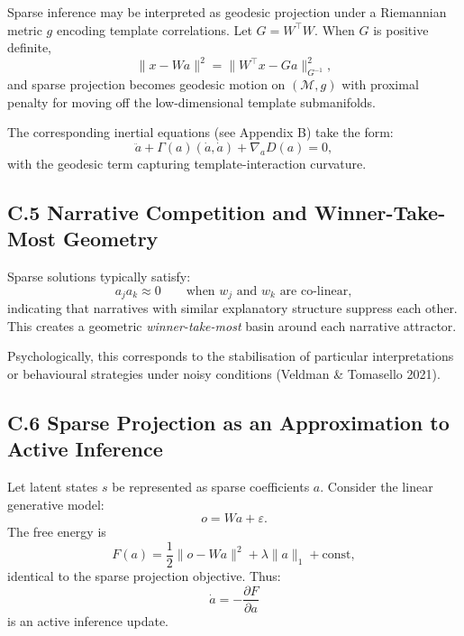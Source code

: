 \documentclass[11pt,a4paper,twoside]{article}
\begin{document}
Sparse inference may be interpreted as geodesic projection under a Riemannian metric $g$ encoding template correlations. Let $G = W^\top W$. When $G$ is positive definite,
\[
\|x - Wa\|^2 = \|W^\top x - Ga\|_{G^{-1}}^2,
\]
and sparse projection becomes geodesic motion on $(\mathcal{M}, g)$ with proximal penalty for moving off the low-dimensional template submanifolds.

The corresponding inertial equations (see Appendix B) take the form:
\[
\ddot{a} + \Gamma(a)(\dot{a},\dot{a}) +
\nabla_a D(a) = 0,
\]
with the geodesic term capturing template-interaction curvature.

\subsection*{C.5 Narrative Competition and Winner-Take-Most Geometry}

Sparse solutions typically satisfy:
\[
a_j a_k \approx 0 \qquad \text{when } w_j \text{ and } w_k \text{ are co-linear},
\]
indicating that narratives with similar explanatory structure suppress each other. This creates a geometric \emph{winner-take-most} basin around each narrative attractor.

\begin{center}
\end{center}

Psychologically, this corresponds to the stabilisation of particular interpretations or behavioural strategies under noisy conditions (Veldman \& Tomasello 2021).

\subsection*{C.6 Sparse Projection as an Approximation to Active Inference}

Let latent states $s$ be represented as sparse coefficients $a$. Consider the linear generative model:
\[
o = W a + \varepsilon.
\]
The free energy is
\[
F(a) = \frac{1}{2}\|o - Wa\|^2 + \lambda\|a\|_1 + \text{const},
\]
identical to the sparse projection objective. Thus:
\[
\dot{a} = -\frac{\partial F}{\partial a}
\]
is an active inference update.
\end{document}
